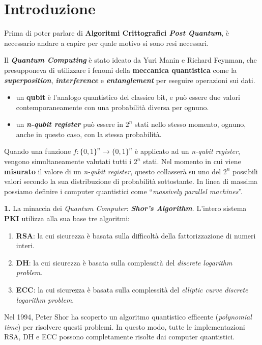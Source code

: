 \chapter{Introduzione}

Prima di poter parlare di \textbf{Algoritmi Crittografici \textit{Post Quantum}}, è necessario andare a capire per quale motivo si sono resi necessari.

Il \textbf{\textit{Quantum Computing}} è stato ideato da Yuri Manin e Richard Feynman, che presupponeva di utilizzare i fenomi della \textbf{meccanica quantistica} come la \textbf{\textit{superposition}}, \textbf{\textit{interference}} e \textbf{\textit{entanglement}} per eseguire operazioni sui dati.
\begin{itemize}[nosep]
    \item un \textbf{qubit} è l'analogo quantistico del classico bit, e può essere due valori contemporaneamente con una probabilità diversa per ognuno.
    \item un \textbf{\textit{n-qubit register}} può essere in $2^n$ stati nello stesso momento, ognuno, anche in questo caso, con la stessa probabilità.
\end{itemize}
Quando una funzione $f: \{0, 1\}^n \rightarrow \{0, 1\}^n$ è applicato ad un \textit{n-qubit register}, vengono simultaneamente valutati tutti i $2^n$ stati. Nel momento in cui viene \textbf{misurato} il valore di un \textit{n-qubit register}, questo collasserà su uno del $2^n$ possibili valori secondo la sua distribuzione di probabilità sottostante. In linea di massima possiamo definire i computer quantistici come ``\textit{massively parallel machines}''.

\begin{flushleft}
    \textbf{1.} La minaccia dei \textit{Quantum Computer}: \textbf{\textit{Shor's Algorithm}}\cite{shor}. L'intero sistema \textbf{PKI} utilizza alla sua base tre algoritmi:
    \begin{enumerate}[nosep]
        \item \textbf{RSA}: la cui sicurezza è basata sulla difficoltà della fattorizzazione di numeri interi.
        \item \textbf{DH}: la cui sicurezza è basata sulla complessità del \textit{discrete logarithm problem}.
        \item \textbf{ECC}: la cui sicurezza è basata sulla complessità del \textit{elliptic curve discrete logarithm problem}.
    \end{enumerate}
    Nel 1994, Peter Shor ha scoperto un algoritmo quantistico efficente (\textit{polynomial time}) per risolvere questi problemi. In questo modo, tutte le implementazioni RSA, DH e ECC possono completamente risolte dai computer quantistici.
\end{flushleft}

